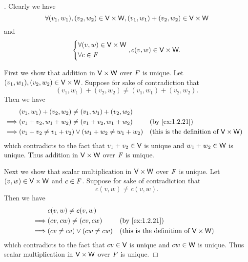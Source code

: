 \begin{proof}[]
  Clearly we have
  \[
    \forall (v_1, w_1), (v_2, w_2) \in \mathsf{V} \times \mathsf{W}, (v_1, w_1) + (v_2, w_2) \in \mathsf{V} \times \mathsf{W}
  \]
  and
  \[
    \begin{dcases}
      \forall (v, w) \in \mathsf{V} \times \mathsf{W} \\
      \forall c \in \mathit{F}
    \end{dcases}, c (v, w) \in \mathsf{V} \times \mathsf{W}.
  \]

  First we show that addition in \(\mathsf{V} \times \mathsf{W}\) over \(\mathit{F}\) is unique.
  Let \((v_1, w_1), (v_2, w_2) \in \mathsf{V} \times \mathsf{W}\).
  Suppose for sake of contradiction that
  \[
    (v_1, w_1) + (v_2, w_2) \neq (v_1, w_1) + (v_2, w_2).
  \]
  Then we have
  \begin{align*}
             & (v_1, w_1) + (v_2, w_2) \neq (v_1, w_1) + (v_2, w_2)                                                                \\
    \implies & (v_1 + v_2, w_1 + w_2) \neq (v_1 + v_2, w_1 + w_2)         &  & \by{ex:1.2.21}                                      \\
    \implies & (v_1 + v_2 \neq v_1 + v_2) \lor (w_1 + w_2 \neq w_1 + w_2) &  & \text{(this is the definition of \(\V \times \W\))}
  \end{align*}
  which contradicts to the fact that \(v_1 + v_2 \in \mathsf{V}\) is unique and \(w_1 + w_2 \in \mathsf{W}\) is unique.
  Thus addition in \(\mathsf{V} \times \mathsf{W}\) over \(\mathit{F}\) is unique.

  Next we show that scalar multiplication in \(\mathsf{V} \times \mathsf{W}\) over \(\mathit{F}\) is unique.
  Let \((v, w) \in \mathsf{V} \times \mathsf{W}\) and \(c \in \mathit{F}\).
  Suppose for sake of contradiction that
  \[
    c(v, w) \neq c(v, w).
  \]
  Then we have
  \begin{align*}
             & c(v, w) \neq c(v, w)                                                                    \\
    \implies & (cv, cw) \neq (cv, cw)         &  & \by{ex:1.2.21}                                      \\
    \implies & (cv \neq cv) \lor (cw \neq cw) &  & \text{(this is the definition of \(\V \times \W\))}
  \end{align*}
  which contradicts to the fact that \(cv \in \mathsf{V}\) is unique and \(cw \in \mathsf{W}\) is unique.
  Thus scalar multiplication in \(\mathsf{V} \times \mathsf{W}\) over \(\mathit{F}\) is unique.


\end{proof}
